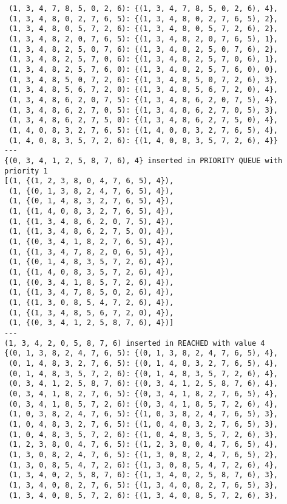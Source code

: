 \documentclass{article}
\begin{document}
\begin{verbatim}
 (1, 3, 4, 7, 8, 5, 0, 2, 6): {(1, 3, 4, 7, 8, 5, 0, 2, 6), 4},
 (1, 3, 4, 8, 0, 2, 7, 6, 5): {(1, 3, 4, 8, 0, 2, 7, 6, 5), 2},
 (1, 3, 4, 8, 0, 5, 7, 2, 6): {(1, 3, 4, 8, 0, 5, 7, 2, 6), 2},
 (1, 3, 4, 8, 2, 0, 7, 6, 5): {(1, 3, 4, 8, 2, 0, 7, 6, 5), 1},
 (1, 3, 4, 8, 2, 5, 0, 7, 6): {(1, 3, 4, 8, 2, 5, 0, 7, 6), 2},
 (1, 3, 4, 8, 2, 5, 7, 0, 6): {(1, 3, 4, 8, 2, 5, 7, 0, 6), 1},
 (1, 3, 4, 8, 2, 5, 7, 6, 0): {(1, 3, 4, 8, 2, 5, 7, 6, 0), 0},
 (1, 3, 4, 8, 5, 0, 7, 2, 6): {(1, 3, 4, 8, 5, 0, 7, 2, 6), 3},
 (1, 3, 4, 8, 5, 6, 7, 2, 0): {(1, 3, 4, 8, 5, 6, 7, 2, 0), 4},
 (1, 3, 4, 8, 6, 2, 0, 7, 5): {(1, 3, 4, 8, 6, 2, 0, 7, 5), 4},
 (1, 3, 4, 8, 6, 2, 7, 0, 5): {(1, 3, 4, 8, 6, 2, 7, 0, 5), 3},
 (1, 3, 4, 8, 6, 2, 7, 5, 0): {(1, 3, 4, 8, 6, 2, 7, 5, 0), 4},
 (1, 4, 0, 8, 3, 2, 7, 6, 5): {(1, 4, 0, 8, 3, 2, 7, 6, 5), 4},
 (1, 4, 0, 8, 3, 5, 7, 2, 6): {(1, 4, 0, 8, 3, 5, 7, 2, 6), 4}}
---
{(0, 3, 4, 1, 2, 5, 8, 7, 6), 4} inserted in PRIORITY QUEUE with priority 1
[(1, {(1, 2, 3, 8, 0, 4, 7, 6, 5), 4}),
 (1, {(0, 1, 3, 8, 2, 4, 7, 6, 5), 4}),
 (1, {(0, 1, 4, 8, 3, 2, 7, 6, 5), 4}),
 (1, {(1, 4, 0, 8, 3, 2, 7, 6, 5), 4}),
 (1, {(1, 3, 4, 8, 6, 2, 0, 7, 5), 4}),
 (1, {(1, 3, 4, 8, 6, 2, 7, 5, 0), 4}),
 (1, {(0, 3, 4, 1, 8, 2, 7, 6, 5), 4}),
 (1, {(1, 3, 4, 7, 8, 2, 0, 6, 5), 4}),
 (1, {(0, 1, 4, 8, 3, 5, 7, 2, 6), 4}),
 (1, {(1, 4, 0, 8, 3, 5, 7, 2, 6), 4}),
 (1, {(0, 3, 4, 1, 8, 5, 7, 2, 6), 4}),
 (1, {(1, 3, 4, 7, 8, 5, 0, 2, 6), 4}),
 (1, {(1, 3, 0, 8, 5, 4, 7, 2, 6), 4}),
 (1, {(1, 3, 4, 8, 5, 6, 7, 2, 0), 4}),
 (1, {(0, 3, 4, 1, 2, 5, 8, 7, 6), 4})]
---
(1, 3, 4, 2, 0, 5, 8, 7, 6) inserted in REACHED with value 4
{(0, 1, 3, 8, 2, 4, 7, 6, 5): {(0, 1, 3, 8, 2, 4, 7, 6, 5), 4},
 (0, 1, 4, 8, 3, 2, 7, 6, 5): {(0, 1, 4, 8, 3, 2, 7, 6, 5), 4},
 (0, 1, 4, 8, 3, 5, 7, 2, 6): {(0, 1, 4, 8, 3, 5, 7, 2, 6), 4},
 (0, 3, 4, 1, 2, 5, 8, 7, 6): {(0, 3, 4, 1, 2, 5, 8, 7, 6), 4},
 (0, 3, 4, 1, 8, 2, 7, 6, 5): {(0, 3, 4, 1, 8, 2, 7, 6, 5), 4},
 (0, 3, 4, 1, 8, 5, 7, 2, 6): {(0, 3, 4, 1, 8, 5, 7, 2, 6), 4},
 (1, 0, 3, 8, 2, 4, 7, 6, 5): {(1, 0, 3, 8, 2, 4, 7, 6, 5), 3},
 (1, 0, 4, 8, 3, 2, 7, 6, 5): {(1, 0, 4, 8, 3, 2, 7, 6, 5), 3},
 (1, 0, 4, 8, 3, 5, 7, 2, 6): {(1, 0, 4, 8, 3, 5, 7, 2, 6), 3},
 (1, 2, 3, 8, 0, 4, 7, 6, 5): {(1, 2, 3, 8, 0, 4, 7, 6, 5), 4},
 (1, 3, 0, 8, 2, 4, 7, 6, 5): {(1, 3, 0, 8, 2, 4, 7, 6, 5), 2},
 (1, 3, 0, 8, 5, 4, 7, 2, 6): {(1, 3, 0, 8, 5, 4, 7, 2, 6), 4},
 (1, 3, 4, 0, 2, 5, 8, 7, 6): {(1, 3, 4, 0, 2, 5, 8, 7, 6), 3},
 (1, 3, 4, 0, 8, 2, 7, 6, 5): {(1, 3, 4, 0, 8, 2, 7, 6, 5), 3},
 (1, 3, 4, 0, 8, 5, 7, 2, 6): {(1, 3, 4, 0, 8, 5, 7, 2, 6), 3},

\end{verbatim}
\end{document}
